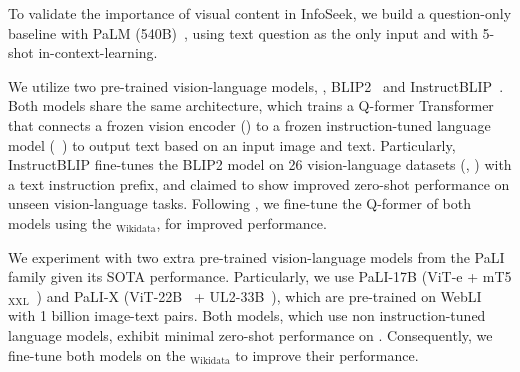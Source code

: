 \documentclass[11pt]{article}
\begin{document}
To validate the importance of visual content in {\sc InfoSeek}, we build a question-only baseline with PaLM (540B)~\citep{chowdhery2022palm}, using text question as the only input and with 5-shot in-context-learning.

We utilize two pre-trained vision-language models, \ie, BLIP2~\citep{li2023blip} and InstructBLIP~\citep{dai2023instructblip}.
Both models share the same architecture, which trains a Q-former Transformer that connects a frozen vision encoder () to a frozen instruction-tuned language model (~\cite{chung2022scaling}) to output text based on an input image and text. Particularly, InstructBLIP fine-tunes the BLIP2 model on 26 vision-language datasets (\eg, ) with a text instruction prefix, and claimed to show improved zero-shot performance on unseen vision-language tasks.
Following \citet{li2023blip}, we fine-tune the Q-former of both models using the \infoseek$_{\text{Wikidata}}$, for improved performance.

We experiment with two extra pre-trained vision-language models from the PaLI~\citep{chen2022pali,chen2023pali} family given its SOTA performance.
Particularly, we use PaLI-17B (ViT-e + mT5$_{\text{XXL}}$~\citep{xue2020mt5}) and PaLI-X (ViT-22B~\citep{dehghani2023scaling} + UL2-33B~\citep{tay2022unifying}), which are pre-trained on WebLI~\citep{chen2022pali} with 1 billion image-text pairs.
Both models, which use non instruction-tuned language models, exhibit minimal zero-shot performance on \infoseek.
Consequently, we fine-tune both models on the \infoseek$_{\text{Wikidata}}$ to improve their performance.
\end{document}
